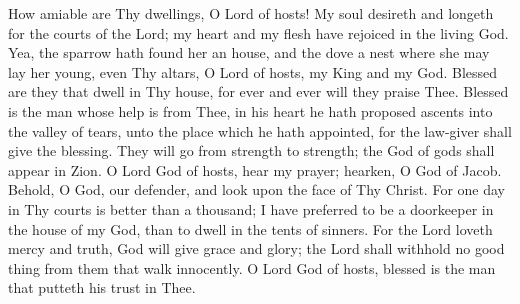 How amiable are Thy dwellings, O Lord of hosts! My soul desireth and longeth for the courts of the Lord; my heart and my flesh have rejoiced in the living God. Yea, the sparrow hath found her an house, and the dove a nest where she may lay her young, even Thy altars, O Lord of hosts, my King and my God. Blessed are they that dwell in Thy house, for ever and ever will they praise Thee. Blessed is the man whose help is from Thee, in his heart he hath proposed ascents into the valley of tears, unto the place which he hath appointed, for the law-giver shall give the blessing. They will go from strength to strength; the God of gods shall appear in Zion. O Lord God of hosts, hear my prayer; hearken, O God of Jacob. Behold, O God, our defender, and look upon the face of Thy Christ. For one day in Thy courts is better than a thousand; I have preferred to be a doorkeeper in the house of my God, than to dwell in the tents of sinners. For the Lord loveth mercy and truth, God will give grace and glory; the Lord shall withhold no good thing from them that walk innocently. O Lord God of hosts, blessed is the man that putteth his trust in Thee.
